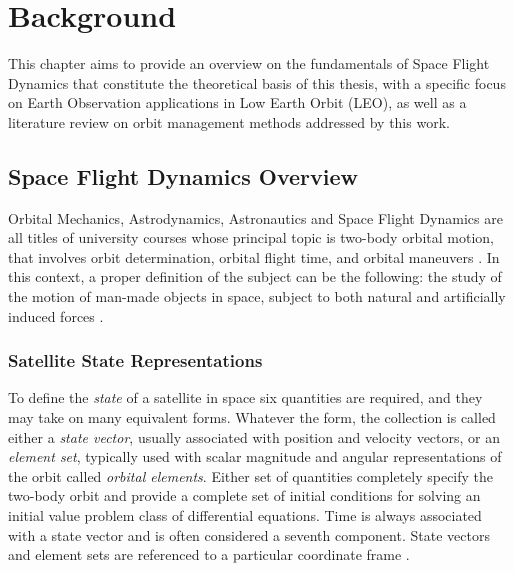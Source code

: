 \chapter{Background}

This chapter aims to provide an overview on the fundamentals of Space Flight Dynamics that constitute the theoretical basis of this thesis, with a specific focus on Earth Observation applications in Low Earth Orbit (LEO), as well as a literature review on orbit management methods addressed by this work.

\section{Space Flight Dynamics Overview}

Orbital Mechanics, Astrodynamics, Astronautics and Space Flight Dynamics are all titles of university courses whose principal topic is two-body orbital motion, that involves orbit determination, orbital flight time, and orbital maneuvers \cite{kluever2018space}.
In this context, a proper definition of the subject can be the following: the study of the motion of man-made objects in space, subject to both natural and artificially induced forces \cite{griffin2004space}.

\subsection{Satellite State Representations}

To define the \textit{state} of a satellite in space six quantities are required, and they may take on many equivalent forms.
Whatever the form, the collection is called either a \textit{state vector}, usually associated with position and velocity vectors, or an \textit{element set}, typically used with scalar magnitude and angular representations of the orbit called \textit{orbital elements}.
Either set of quantities completely specify the two-body orbit and provide a complete set of initial conditions for solving an initial value problem class of differential equations.
Time is always associated with a state vector and is often considered a seventh component.
State vectors and element sets are referenced to a particular coordinate frame \cite{vallado2013fundamentals}.


